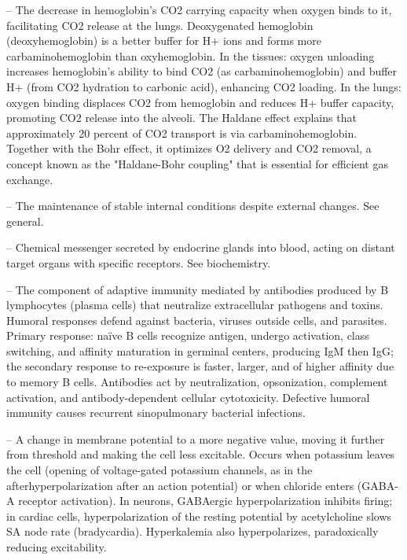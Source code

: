 -- The decrease in hemoglobin's CO2 carrying capacity when oxygen binds to it, facilitating CO2 release at the lungs. Deoxygenated hemoglobin (deoxyhemoglobin) is a better buffer for H+ ions and forms more carbaminohemoglobin than oxyhemoglobin. In the tissues: oxygen unloading increases hemoglobin's ability to bind CO2 (as carbaminohemoglobin) and buffer H+ (from CO2 hydration to carbonic acid), enhancing CO2 loading. In the lungs: oxygen binding displaces CO2 from hemoglobin and reduces H+ buffer capacity, promoting CO2 release into the alveoli. The Haldane effect explains that approximately 20 percent of CO2 transport is via carbaminohemoglobin. Together with the Bohr effect, it optimizes O2 delivery and CO2 removal, a concept known as the "Haldane-Bohr coupling" that is essential for efficient gas exchange.

-- The maintenance of stable internal conditions despite external changes. See general.

-- Chemical messenger secreted by endocrine glands into blood, acting on distant target organs with specific receptors. See biochemistry.

-- The component of adaptive immunity mediated by antibodies produced by B lymphocytes (plasma cells) that neutralize extracellular pathogens and toxins. Humoral responses defend against bacteria, viruses outside cells, and parasites. Primary response: naïve B cells recognize antigen, undergo activation, class switching, and affinity maturation in germinal centers, producing IgM then IgG; the secondary response to re-exposure is faster, larger, and of higher affinity due to memory B cells. Antibodies act by neutralization, opsonization, complement activation, and antibody-dependent cellular cytotoxicity. Defective humoral immunity causes recurrent sinopulmonary bacterial infections.

-- A change in membrane potential to a more negative value, moving it further from threshold and making the cell less excitable. Occurs when potassium leaves the cell (opening of voltage-gated potassium channels, as in the afterhyperpolarization after an action potential) or when chloride enters (GABA-A receptor activation). In neurons, GABAergic hyperpolarization inhibits firing; in cardiac cells, hyperpolarization of the resting potential by acetylcholine slows SA node rate (bradycardia). Hyperkalemia also hyperpolarizes, paradoxically reducing excitability.


